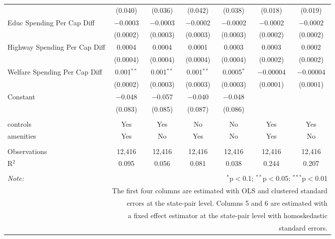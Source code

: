 \begin{table}[!htbp]
\begin{tabular}{@{\extracolsep{5pt}}lcccccc}
  & (0.040) & (0.036) & (0.042) & (0.038) & (0.018) & (0.019) \\ 
  Educ Spending Per Cap Diff & $-$0.0003 & $-$0.0003 & $-$0.0002 & $-$0.0002 & $-$0.0002 & $-$0.0002 \\ 
  & (0.0002) & (0.0003) & (0.0003) & (0.0003) & (0.0002) & (0.0002) \\ 
  Highway Spending Per Cap Diff & 0.0004 & 0.0004 & 0.0001 & 0.0003 & 0.0003 & 0.0002 \\ 
  & (0.0004) & (0.0004) & (0.0004) & (0.0004) & (0.0002) & (0.0002) \\ 
  Welfare Spending Per Cap Diff & 0.001$^{**}$ & 0.001$^{**}$ & 0.001$^{**}$ & 0.0005$^{*}$ & $-$0.00004 & $-$0.00004 \\ 
  & (0.0002) & (0.0003) & (0.0003) & (0.0003) & (0.0001) & (0.0001) \\ 
  Constant & $-$0.048 & $-$0.057 & $-$0.040 & $-$0.048 &  &  \\ 
  & (0.083) & (0.085) & (0.087) & (0.086) &  &  \\ 
 \hline \\[-1.8ex] 
controls & Yes & Yes & No & No & Yes & Yes \\ 
amenities & Yes & No & Yes & No & Yes & No \\ 
\hline \\[-1.8ex] 
Observations & 12,416 & 12,416 & 12,416 & 12,416 & 12,416 & 12,416 \\ 
R$^{2}$ & 0.095 & 0.056 & 0.081 & 0.038 & 0.244 & 0.207 \\ 
\hline 
\hline \\[-1.8ex] 
\textit{Note:}  & \multicolumn{6}{r}{$^{*}$p$<$0.1; $^{**}$p$<$0.05; $^{***}$p$<$0.01} \\ 
 & \multicolumn{6}{r}{The first four columns are estimated with OLS and clustered standard} \\ 
 & \multicolumn{6}{r}{ errors at the state-pair level. Columns 5 and 6 are estimated with} \\ 
 & \multicolumn{6}{r}{a fixed effect estimator at the state-pair level with homoskedastic} \\ 
 & \multicolumn{6}{r}{standard errors.} \\ 
\end{tabular} 
\end{table} 
